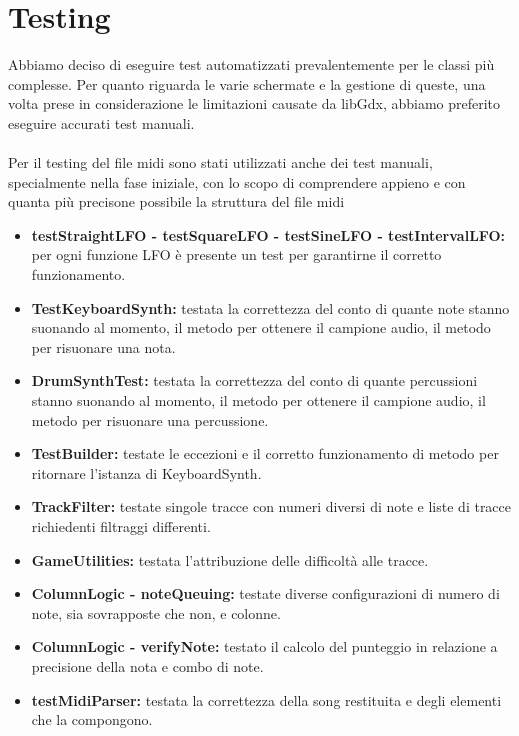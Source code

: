 \documentclass[a4paper,12pt]{report}
\begin{document}
\section{Testing}
Abbiamo deciso di eseguire test automatizzati prevalentemente per le classi più complesse. Per quanto riguarda le varie schermate e la gestione di queste, una volta prese in considerazione le limitazioni causate da libGdx, abbiamo preferito eseguire accurati test manuali. \\ \\ Per il testing del file midi sono stati utilizzati anche dei test manuali, specialmente nella fase iniziale, con lo scopo di comprendere appieno e con quanta più precisone possibile la struttura del file midi \\
{
\begin{itemize}
	\begingroup
	\fontsize{10pt}{12pt}\selectfont	
	\item \textbf{testStraightLFO - testSquareLFO - testSineLFO - testIntervalLFO:} per ogni funzione LFO è presente un test per garantirne il corretto funzionamento.	
	\item \textbf{TestKeyboardSynth:} testata la correttezza del conto di quante note stanno suonando al momento, il metodo per ottenere il campione audio, il metodo per risuonare una nota.	
	\item \textbf{DrumSynthTest:} testata la correttezza del conto di quante percussioni stanno suonando al momento, il metodo per ottenere il campione audio, il metodo per risuonare una percussione.	
	\item \textbf{TestBuilder:} testate le eccezioni e il corretto funzionamento di metodo per ritornare l'istanza di KeyboardSynth.
	\item \textbf{TrackFilter:} testate singole tracce con numeri diversi di note e liste di tracce richiedenti filtraggi differenti.	
	\item \textbf{GameUtilities:} testata l'attribuzione delle difficoltà alle tracce.	
	\item \textbf{ColumnLogic - noteQueuing:} testate diverse configurazioni di numero di note, sia sovrapposte che non, e colonne.	
	\item \textbf{ColumnLogic - verifyNote:} testato il calcolo del punteggio in relazione a precisione della nota e combo di note.
	\item \textbf{testMidiParser:} testata la correttezza della song restituita e degli elementi che la compongono.
	\endgroup
\end{itemize}
}
\newpage
\end{document}
